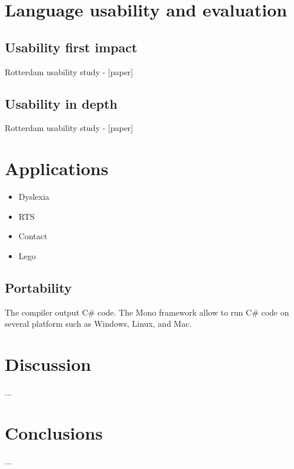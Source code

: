 \documentclass[10pt,a4paper]{book}
\begin{document}
\chapter{Language usability and evaluation}
\section{Usability first impact}
Rotterdam usability study - [paper]
\section{Usability in depth}
Rotterdam usability study - [paper]


\chapter{Applications}
\begin{itemize}
\item Dyslexia
\item RTS
\item Contact
\item Lego
\end{itemize}

\section{Portability}
The compiler output C\# code. The Mono framework allow to run C\# code on several platform such as Windows, Linux, and Mac.


\chapter{Discussion}
...

\chapter{Conclusions}
...


\end{document}
